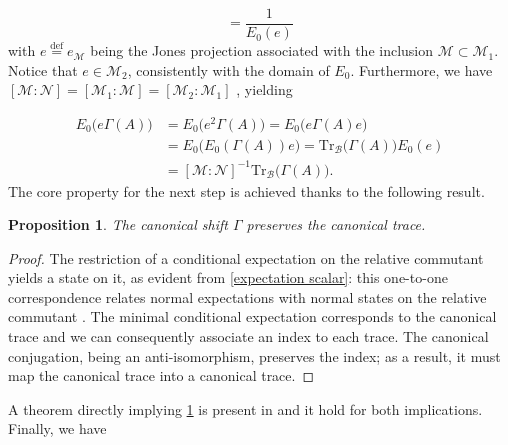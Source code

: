 \documentclass[a4paper,11pt]{article}
\newcommand{\eqdef}{\overset{\mathrm{def}}{=}}
\newtheorem{Proposition}{Proposition}[subsection]
\begin{document}
\begin{equation}
    [\mathcal{M}_2 : \mathcal{M}_1] = \frac{1}{E_0(e)}
\end{equation}
%
with $e \eqdef e_{\mathcal{M}}$ being the Jones projection associated with the inclusion $\mathcal{M} \subset \mathcal{M}_1$. Notice that $e \in \mathcal{M}_2$, consistently with the domain of $E_0$. Furthermore, we have $[\mathcal{M}:\mathcal{N}] = [\mathcal{M}_1:\mathcal{M}] = [\mathcal{M}_2:\mathcal{M}_1]$ \cite{Longo1}, yielding

\begin{equation}
    \begin{split}
        E_0 \big( e \Gamma(A) \big) &= E_0 \big( e^2 \Gamma(A) \big) = E_0 \big( e \Gamma(A) e \big) \\
        &= E_0 \big( E_0 ( \Gamma(A) ) e \big) = \mathrm{Tr}_{\mathcal{B}}\big( \Gamma(A) \big) E_0 (e) \\
        &= [\mathcal{M}:\mathcal{N}]^{-1} \mathrm{Tr}_{\mathcal{B}}\big( \Gamma(A) \big) \text{.}
    \end{split}
\end{equation}
%
The core property for the next step is achieved thanks to the following result.

\begin{Proposition}
    The canonical shift $\Gamma$ preserves the canonical trace.
    \label{Preserved trace main}
\end{Proposition}

\begin{proof}
    The restriction of a conditional expectation on the relative commutant yields a state on it, as evident from \ref{expectation scalar}: this one-to-one correspondence relates normal expectations with normal states on the relative commutant \cite{Longo}. The minimal conditional expectation corresponds to the canonical trace and we can consequently associate an index to each trace. The canonical conjugation, being an anti-isomorphism, preserves the index; as a result, it must map the canonical trace into a canonical trace.
\end{proof}

A theorem directly implying \ref{Preserved trace main} is present in \cite{Longo3} and it hold for both implications. Finally, we have
\end{document}
